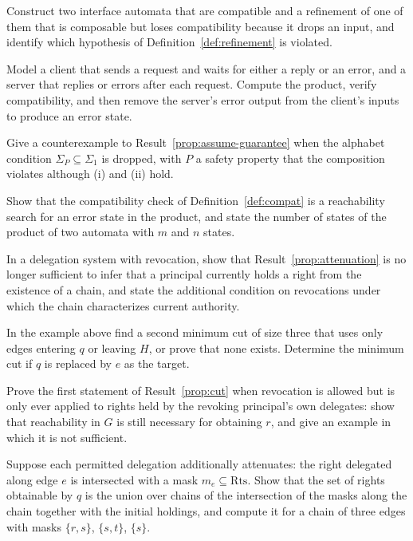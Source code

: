 \begin{exercise}
Construct two interface automata that are compatible and a refinement of one of them that is composable but loses compatibility because it drops an input, and identify which hypothesis of Definition~\ref{def:refinement} is violated.
\end{exercise}

\begin{exercise}
Model a client that sends a request and waits for either a reply or an error, and a server that replies or errors after each request. Compute the product, verify compatibility, and then remove the server's error output from the client's inputs to produce an error state.
\end{exercise}

\begin{exercise}
Give a counterexample to Result~\ref{prop:assume-guarantee} when the alphabet condition $\Sigma_P\subseteq\Sigma_1$ is dropped, with $P$ a safety property that the composition violates although (i) and (ii) hold.
\end{exercise}

\begin{exercise}
Show that the compatibility check of Definition~\ref{def:compat} is a reachability search for an error state in the product, and state the number of states of the product of two automata with $m$ and $n$ states.
\end{exercise}

\begin{exercise}
In a delegation system with revocation, show that Result~\ref{prop:attenuation} is no longer sufficient to infer that a principal currently holds a right from the existence of a chain, and state the additional condition on revocations under which the chain characterizes current authority.
\end{exercise}


\begin{exercise}
In the example above find a second minimum cut of size three that uses only edges entering $q$ or leaving $H$, or prove that none exists. Determine the minimum cut if $q$ is replaced by $e$ as the target.
\end{exercise}

\begin{exercise}
Prove the first statement of Result~\ref{prop:cut} when revocation is allowed but is only ever applied to rights held by the revoking principal's own delegates: show that reachability in $G$ is still necessary for obtaining $r$, and give an example in which it is not sufficient.
\end{exercise}

\begin{exercise}
Suppose each permitted delegation additionally attenuates: the right delegated along edge $e$ is intersected with a mask $m_e\subseteq\mathrm{Rts}$. Show that the set of rights obtainable by $q$ is the union over chains of the intersection of the masks along the chain together with the initial holdings, and compute it for a chain of three edges with masks $\{r,s\}$, $\{s,t\}$, $\{s\}$.\label{ex:mask-chain}
\end{exercise}

